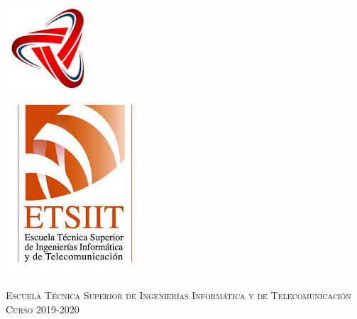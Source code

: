\begin{titlepage}
\begin{minipage}{\textwidth}
        \includegraphics[scale=1.0]{images/logo.png} \\
        \vspace{0.3cm}
        \includegraphics[scale=0.3]{images/etsiit.jpeg}

        \vspace{0.7cm}
        \textsc{Escuela Técnica Superior de Ingenierías Informática y de Telecomunicación}\\
        \vspace{0.5cm}
        \textsc{Curso 2019-2020}
    \end{minipage}
\end{titlepage}

